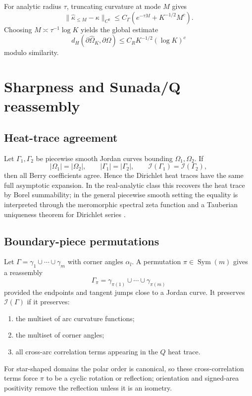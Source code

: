 \documentclass[11pt,reqno]{amsart}
\theoremstyle{plain}
\theoremstyle{definition}
\theoremstyle{remark}
\DeclareMathOperator{\Sym}{Sym}
\newcommand{\Qop}{Q}
\newcommand{\Icalbb}{\mathcal{I}}
\begin{document}
For analytic radius $\tau$, truncating curvature at mode $M$ gives
\[
\|\widehat\kappa_{\leq M}-\kappa\|_{C^0}
\leq C_\Gamma\left(e^{-\tau M}+K^{-1/2}M^c\right).
\]
Choosing $M\asymp\tau^{-1}\log K$ yields the global estimate
\[
d_H(\partial\widehat\Omega_K,\partial\Omega)
\leq C_RK^{-1/2}(\log K)^c
\]
modulo similarity.

\section{Sharpness and Sunada/Q reassembly}\label{app:sharpness-details}

\subsection{Heat-trace agreement}\label{app:ss-heat-agreement}

Let $\Gamma_1,\Gamma_2$ be piecewise smooth Jordan curves bounding $\Omega_1,\Omega_2$. If
\[
|\Omega_1|=|\Omega_2|,\qquad |\Gamma_1|=|\Gamma_2|,\qquad
\Icalbb(\Gamma_1)=\Icalbb(\Gamma_2),
\]
then all Berry coefficients agree. Hence the Dirichlet heat traces have the same full asymptotic expansion. In the real-analytic class this recovers the heat trace by Borel summability; in the general piecewise smooth setting the equality is interpreted through the meromorphic spectral zeta function and a Tauberian uniqueness theorem for Dirichlet series \cite{HardyRogosinski}.

\subsection{Boundary-piece permutations}\label{app:ss-piece-permutation}

Let $\Gamma=\gamma_1\cup\cdots\cup\gamma_m$ with corner angles $\alpha_l$. A permutation $\pi\in\Sym(m)$ gives a reassembly
\[
\Gamma_\pi=\gamma_{\pi(1)}\cup\cdots\cup\gamma_{\pi(m)}
\]
provided the endpoints and tangent jumps close to a Jordan curve. It preserves $\Icalbb(\Gamma)$ if it preserves:
\begin{enumerate}
\item the multiset of arc curvature functions;
\item the multiset of corner angles;
\item all cross-arc correlation terms appearing in the $\Qop$ heat trace.
\end{enumerate}
For star-shaped domains the polar order is canonical, so these cross-correlation terms force $\pi$ to be a cyclic rotation or reflection; orientation and signed-area positivity remove the reflection unless it is an isometry.
\end{document}
